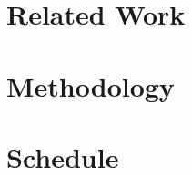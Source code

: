 \documentclass[a4paper, 12pt]{article}
\begin{document}

\section{Related Work}



\section{Methodology}



\section{Schedule}

\end{document}
